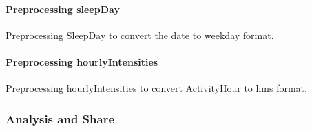 \documentclass[
]{article}
\newenvironment{Shaded}{\begin{snugshade}}{\end{snugshade}}
\newcommand{\AttributeTok}[1]{\textcolor[rgb]{0.77,0.63,0.00}{#1}}
\newcommand{\FunctionTok}[1]{\textcolor[rgb]{0.00,0.00,0.00}{#1}}
\newcommand{\NormalTok}[1]{#1}
\newcommand{\OtherTok}[1]{\textcolor[rgb]{0.56,0.35,0.01}{#1}}
\newcommand{\SpecialCharTok}[1]{\textcolor[rgb]{0.00,0.00,0.00}{#1}}
\newcommand{\StringTok}[1]{\textcolor[rgb]{0.31,0.60,0.02}{#1}}
\begin{document}
\hypertarget{preprocessing-sleepday}{%
\paragraph{Preprocessing sleepDay}\label{preprocessing-sleepday}}

Preprocessing SleepDay to convert the date to weekday format.

\begin{Shaded}
\end{Shaded}

\hypertarget{preprocessing-hourlyintensities}{%
\paragraph{Preprocessing
hourlyIntensities}\label{preprocessing-hourlyintensities}}

Preprocessing hourlyIntensities to convert ActivityHour to hms format.

\begin{Shaded}
\end{Shaded}

\hypertarget{analysis-and-share}{%
\subsubsection{Analysis and Share}\label{analysis-and-share}}
\end{document}
